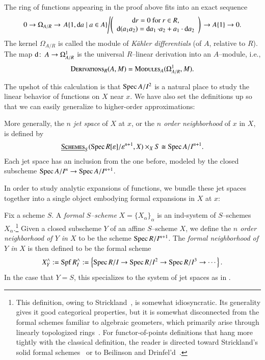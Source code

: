 \begin{definition}
The ring of functions appearing in the proof above fits into an exact sequence \[0 \to \Omega_{A/R} \to \left. A\{1, \operatorname{d\mathit{a}} \mid a \in A\} \middle/ \left( \begin{array}{c} \text{$\operatorname{d\mathit{r}} = 0$ for $r \in R$}, \\ \operatorname{d}(a_1 a_2) = \operatorname{d\mathit{a}_1} \cdot a_2 + a_1 \cdot \operatorname{d\mathit{a}_2} \end{array} \right) \right. \to A\{1\} \to 0.\]  The kernel $\Omega_{A/R}$ is called the module of \textit{K\"ahler differentials} (of $A$, relative to $R$).  The map $\operatorname d\colon\thinspace A\to \Omega^1_{A/R}$ is the universal $R$--linear derivation into an $A$--module, i.e., \[\normalfont\textsc{Derivations}_R(A, M) = \normalfont\textsc{Modules}_A(\Omega^1_{A/R}, M).\]
\end{definition}

The upshot of this calculation is that $\operatorname{Spec} A/I^2$ is a natural place to study the linear behavior of functions on $X$ near $x$.  We have also set the definitions up so that we can easily generalize to higher-order approximations:
\begin{definition}\label{JetSpacesDefn}
More generally, the \textit{$n${\th} jet space} of $X$ at $x$, or the \textit{$n${\th} order neighborhood} of $x$ in $X$, is defined by \[\operatorname{\underline{\smash{\normalfont\textsc{Schemes}}}}_S(\operatorname{Spec} R[\varepsilon] / \varepsilon^{n+1}, X) \times_X S \cong \operatorname{Spec} A / I^{n+1}.\]  Each jet space has an inclusion from the one before, modeled by the closed subscheme $\operatorname{Spec} A/I^n \to \operatorname{Spec} A / I^{n+1}$.
\end{definition}

In order to study analytic expansions of functions, we bundle these jet spaces together into a single object embodying formal expansions in $X$ at $x$:
\begin{definition}\label{DefnCompletion}
Fix a scheme $S$.  A \textit{formal $S$--scheme} $X = \{X_\alpha\}_\alpha$ is an ind-system of $S$--schemes $X_\alpha$.\footnote{This definition, owing to Strickland~\cite[Definition 4.1]{StricklandFSFG}, is somewhat idiosyncratic.  Its generality gives it good categorical properties, but it is somewhat disconnected from the formal schemes familiar to algebraic geometers, which primarily arise through linearly topologized rings~\cite[pg.\ 194]{Hartshorne}.  For functor-of-points definitions that hang more tightly with the classical definition, the reader is directed toward Strickland's solid formal schemes~\cite[Section 4.2]{StricklandFSFG} or to Beilinson and Drinfel'd~\cite[Section 7.11.1]{BeilinsonDrinfeld}.}  Given a closed subscheme $Y$ of an affine $S$--scheme $X$, we define the \textit{$n${\th} order neighborhood of $Y$ in $X$} to be the scheme $\operatorname{Spec} R/I^{n+1}$.  The \textit{formal neighborhood of $Y$ in $X$} is then defined to be the formal scheme \[X^\wedge_Y := \operatorname{Spf} R^\wedge_I := \left\{ \operatorname{Spec} R/I \to \operatorname{Spec} R/I^2 \to \operatorname{Spec} R/I^3 \to \cdots \right\}.\]  In the case that $Y = S$, this specializes to the system of jet spaces as in .
\end{definition}

